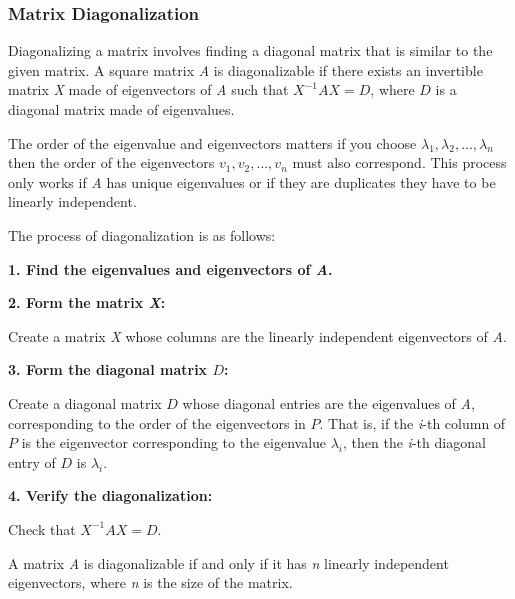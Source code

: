 \subsubsection{Matrix Diagonalization}

Diagonalizing a matrix involves finding a diagonal matrix that is similar to the given matrix. 
A square matrix \emph{A} is diagonalizable if there exists an invertible matrix \emph{X} made of eigenvectors of 
\emph{A} such that \(X^{-1}AX = D\), where \(D\) is a diagonal matrix made of eigenvalues.
\vspace{\baselineskip}

The order of the eigenvalue and eigenvectors matters if you choose 
\(\lambda_1, \lambda_2, \dots, \lambda_n\) then the order of the eigenvectors 
\(v_1, v_2, \dots, v_n\) must also correspond. This process only works if \emph{A} 
has unique eigenvalues or if they are duplicates they have to be linearly independent.
\vspace{\baselineskip}

The process of diagonalization is as follows:
\vspace{\baselineskip}

\textbf{1. Find the eigenvalues and eigenvectors of \emph{A}.}
\vspace{\baselineskip}

\textbf{2. Form the matrix \emph{X}:}

Create a matrix \emph{X} whose columns are the linearly independent eigenvectors of \emph{A}.
\vspace{\baselineskip}

\textbf{3. Form the diagonal matrix \(D\):} 

Create a diagonal matrix \(D\) whose diagonal entries are the eigenvalues of \emph{A}, corresponding to 
the order of the eigenvectors in \(P\). That is, if the \emph{i}-th column of \(P\) is the eigenvector 
corresponding to the eigenvalue \(\lambda_i\), then the \emph{i}-th diagonal entry of \(D\) is \(\lambda_i\).
\vspace{\baselineskip}

\textbf{4. Verify the diagonalization:}
    
Check that \(X^{-1}AX = D\).
\vspace{\baselineskip}

A matrix \emph{A} is diagonalizable if and only if it has \emph{n} linearly independent eigenvectors, where 
\emph{n} is the size of the matrix.
\vspace{\baselineskip}

